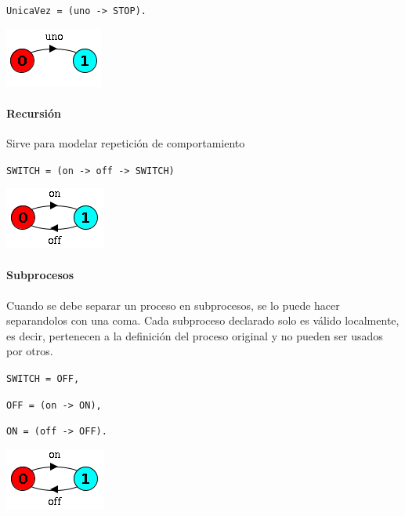 \begin{center}
\begin{minipage}{0.35\textwidth}
\texttt{UnicaVez = (uno -> STOP).}
\end{minipage}
\begin{minipage}{0.35\textwidth}
	\includegraphics[scale=1]{imagenes/lts-uno}
\end{minipage}
\end{center}

\paragraph{Recursión}
Sirve para modelar repetición de comportamiento
\begin{center}
\begin{minipage}{0.45\textwidth}
\texttt{SWITCH = (on -> off -> SWITCH)}
\end{minipage}
\begin{minipage}{0.415\textwidth}
	\includegraphics[scale=1]{imagenes/lts-switch}
\end{minipage}
\end{center}

\paragraph{Subprocesos} 
Cuando se debe separar un proceso en subprocesos, se lo puede hacer separandolos con una coma. Cada subproceso declarado solo es válido localmente, es decir, pertenecen a la definición del proceso original y no pueden ser usados por otros.
\begin{center}
\begin{minipage}{0.25\textwidth}
\texttt{SWITCH = OFF,}

\texttt{OFF    = (on -> ON),}

\texttt{ON     = (off -> OFF).}

\end{minipage}
\begin{minipage}{0.5\textwidth}
	\includegraphics[scale=1]{imagenes/lts-switch}
\end{minipage}
\end{center}

